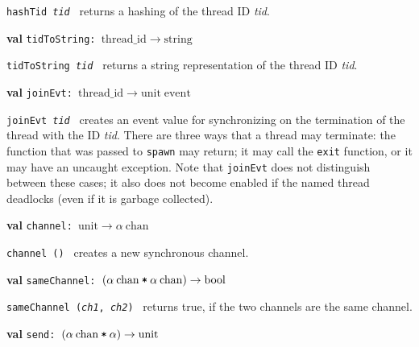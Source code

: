 \begin{descr}
\begin{speccomment}
\item {\tt hash\-Tid \textit{tid}           } 
returns a hashing of the thread ID \textit{tid}.\-     \end{speccomment}
\item {}{\textbf{val}} {\tt tidToString: \(\mathrm{thread\_id}\rightarrow \mathrm{string}\)}\label{val-CML.tidToString}


\begin{speccomment}
\item {\tt tid\-To\-String \textit{tid}           } 
returns a string representation of the thread ID \textit{tid}.\-     \end{speccomment}
\item {}{\textbf{val}} {\tt joinEvt: \(\mathrm{thread\_id}\rightarrow \mathrm{unit}\;\mathrm{event}\)}\label{val-CML.joinEvt}


\begin{speccomment}
\item {\tt join\-Evt \textit{tid}           } 
creates an event value for synchronizing on the termination of 	  the thread with the ID \textit{tid}.\- 	  There are three ways that a thread may terminate: the function that 	  was passed to \texttt{spawn} may return; it may call the \texttt{exit} 	  function, or it may have an uncaught exception.\- 	  Note that \texttt{join\-Evt} does not distinguish between these 	  cases; it also does not become enabled if the named thread deadlocks 	  (even if it is garbage collected).\-     \end{speccomment}
\item {}{\textbf{val}} {\tt channel: \(\mathrm{unit}\rightarrow \alpha\:\mathrm{chan}\)}\label{val-CML.channel}


\begin{speccomment}
\item {\tt channel ()           } 
creates a new synchronous channel.\-     \end{speccomment}
\item {}{\textbf{val}} {\tt sameChannel: \((\alpha\:\mathrm{chan}\:\verb,*,\:\alpha\:\mathrm{chan})\rightarrow \mathrm{bool}\)}\label{val-CML.sameChannel}


\begin{speccomment}
\item {\tt same\-Channel (\textit{ch1}, \textit{ch2})           } 
returns true, if the two channels are the same channel.\-     \end{speccomment}
\item {}{\textbf{val}} {\tt send: \((\alpha\:\mathrm{chan}\:\verb,*,\:\alpha)\rightarrow \mathrm{unit}\)}\label{val-CML.send}



\end{descr}

